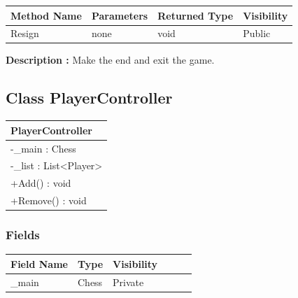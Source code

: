 \documentclass[12pt]{article}
\begin{document}
\begin{table}[H]
    \begin{tabular}{|l|l|l|l|}
    \hline
    \rowcolor[HTML]{EFEFEF} 
    \cellcolor[HTML]{EFEFEF}\textbf{Method Name} & \textbf{Parameters}    & \textbf{Returned Type} & \textbf{Visibility} \\ \hline
    Resign                                       & none                   & void                   & Public             \\ \hline
    \end{tabular}
\end{table}

\textbf{Description :} Make the end and exit the game.

\newpage


\subsection{Class PlayerController}

\begin{table}[H]
    \begin{tabular}{|l|}
    \hline
    \rowcolor[HTML]{C0C0C0} 
    \textbf{PlayerController}                       \\ \hline
    \rowcolor[HTML]{EFEFEF} 
    -\_main : Chess                               \\ \hline
    \rowcolor[HTML]{EFEFEF} 
    -\_list : List\textless{}{}Player\textgreater{}{} \\ \hline
    \rowcolor[HTML]{FFFFFF} 
    +Add() : void                                 \\ \hline
    \rowcolor[HTML]{FFFFFF} 
    +Remove() : void                              \\ \hline
    \end{tabular}
\end{table}

\subsubsection{Fields}

\begin{table}[H]
    \begin{tabular}{llllll}
    \hline
    \multicolumn{1}{|l|}{\cellcolor[HTML]{EFEFEF}\textbf{Field Name}} & \multicolumn{1}{l|}{\cellcolor[HTML]{EFEFEF}\textbf{Type}} & \multicolumn{1}{l|}{\cellcolor[HTML]{EFEFEF}\textbf{Visibility}} \\ \hline
    \multicolumn{1}{|l|}{\_main}                                      & \multicolumn{1}{l|}{Chess}                                 & \multicolumn{1}{l|}{Private}                                     \\ \hline
    \end{tabular}
\end{table}
\end{document}
